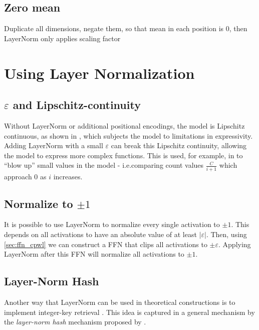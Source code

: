 \subsection{Zero mean}

Duplicate all dimensions, negate them, so that mean in each position is $0$, then LayerNorm only applies scaling factor


\section{Using Layer Normalization}

\subsection{$\varepsilon$ and Lipschitz-continuity}

Without LayerNorm or additional positional encodings, the model is Lipschitz continuous, as shown in \citet{hahn-2020-theoretical}, which subjects the model to limitations in expressivity. Adding LayerNorm with a small $\varepsilon$ can break this Lipschitz continuity, allowing the model to express more complex functions. This is used, for example, in \citet{yang2024counting} to ``blow up'' small values in the model - i.e.comparing count values $\frac{C}{i+1}$ which approach $0$ as $i$ increases.

\subsection{Normalize to \texorpdfstring{${\pm}1$}{plus/minus 1}}

It is possible to use LayerNorm to normalize every single activation to $\pm1$. This depends on all activations to have an absolute value of at least $|\varepsilon|$. Then, using \ref{sec:ffn_cpwl} we can construct a FFN that clips all activations to $\pm\varepsilon$. Applying LayerNorm after this FFN will normalize all activations to $\pm1$.

\subsection{Layer-Norm Hash} \label{sec:ln_hash}

Another way that LayerNorm can be used in theoretical constructions is to implement integer-key retrieval \citep{yao-2021-self-attention,merrill-sabharwal-2024-cot,merrill2024little}.
This idea is captured in a general mechanism by the \emph{layer-norm hash} mechanism proposed by \citet{merrill-sabharwal-2024-cot}.

